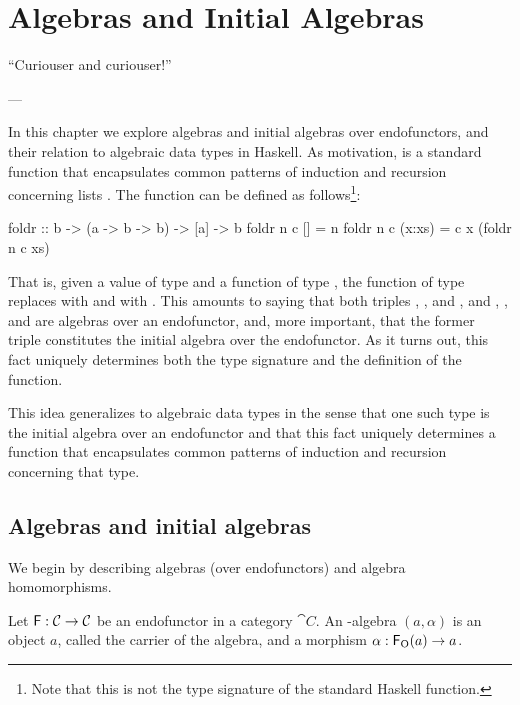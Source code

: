 \chapter{Algebras and Initial Algebras}
\label{chap:algebras}

\epigraph{
  ``Curiouser and curiouser!''
}{---\textcite[23]{carroll-2004}}

In this chapter we explore algebras and initial algebras over
endofunctors, and their relation to algebraic data types in Haskell.
As motivation,  is a standard function that
encapsulates common patterns of induction and recursion concerning
lists \parencite[355--356]{hutton-1999}. The 
function can be defined as follows\footnote{Note that this is not the
  type signature of the standard Haskell 
  function.}:
\begin{codehaskell}
foldr :: b -> (a -> b -> b) -> [a] -> b
foldr n c []     = n
foldr n c (x:xs) = c x (foldr n c xs)
\end{codehaskell}
That is, given a value  of type  and a
function  of type , the
function  of type 
replaces \texthaskell{[]} with  and \texthaskell{(:)}
with . This amounts to saying that both triples
\texthaskell{[a]}, \texthaskell{[]}, and \texthaskell{(:)}, and
, , and  are algebras
over an endofunctor, and, more important, that the former triple
constitutes the initial algebra over the endofunctor. As it turns out,
this fact uniquely determines both the type signature and the
definition of the  function.

This idea generalizes to algebraic data types in the sense that one
such type is the initial algebra over an endofunctor and that this
fact uniquely determines a function that encapsulates common patterns
of induction and recursion concerning that type.

\section{Algebras and initial algebras}
\label{sec:algebras}

We begin by describing algebras (over endofunctors) and algebra
homomorphisms.

\begin{definition}
  \label{def:algebra}


  Let $\mathsf{F}: \mathcal{C} \to \mathcal{C}$ be an endofunctor in a category
  $\cat{C}$. An -al\-ge\-bra $(a,\alpha)$ is an object $a$,
  called the carrier of the algebra, and a morphism $\alpha:
  \mathsf{F}_{\operatorname{O}}(a) \to a$.

\end{definition}

